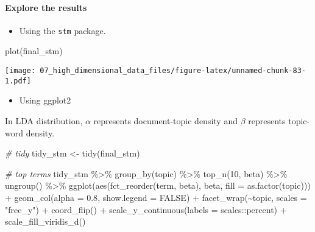 \documentclass[
]{book}
\newenvironment{Shaded}{\begin{snugshade}}{\end{snugshade}}
\newcommand{\AttributeTok}[1]{\textcolor[rgb]{0.77,0.63,0.00}{#1}}
\newcommand{\CommentTok}[1]{\textcolor[rgb]{0.56,0.35,0.01}{\textit{#1}}}
\newcommand{\ConstantTok}[1]{\textcolor[rgb]{0.00,0.00,0.00}{#1}}
\newcommand{\DecValTok}[1]{\textcolor[rgb]{0.00,0.00,0.81}{#1}}
\newcommand{\FloatTok}[1]{\textcolor[rgb]{0.00,0.00,0.81}{#1}}
\newcommand{\FunctionTok}[1]{\textcolor[rgb]{0.00,0.00,0.00}{#1}}
\newcommand{\NormalTok}[1]{#1}
\newcommand{\OtherTok}[1]{\textcolor[rgb]{0.56,0.35,0.01}{#1}}
\newcommand{\SpecialCharTok}[1]{\textcolor[rgb]{0.00,0.00,0.00}{#1}}
\newcommand{\StringTok}[1]{\textcolor[rgb]{0.31,0.60,0.02}{#1}}
\providecommand{\tightlist}{%
  \setlength{\itemsep}{0pt}\setlength{\parskip}{0pt}}
\begin{document}
\hypertarget{explore-the-results}{%
\paragraph{Explore the results}\label{explore-the-results}}

\begin{itemize}
\tightlist
\item
  Using the \texttt{stm} package.
\end{itemize}

\begin{Shaded}
\begin{Highlighting}[]
\FunctionTok{plot}\NormalTok{(final\_stm)}
\end{Highlighting}
\end{Shaded}

\texttt{[image: 07\_high\_dimensional\_data\_files/figure-latex/unnamed-chunk-83-1.pdf]}

\begin{itemize}
\tightlist
\item
  Using ggplot2
\end{itemize}

In LDA distribution, \(\alpha\) represents document-topic density and \(\beta\) represents topic-word density.

\begin{Shaded}
\begin{Highlighting}[]
\CommentTok{\# tidy}
\NormalTok{tidy\_stm }\OtherTok{\textless{}{-}} \FunctionTok{tidy}\NormalTok{(final\_stm)}

\CommentTok{\# top terms}
\NormalTok{tidy\_stm }\SpecialCharTok{\%\textgreater{}\%}
  \FunctionTok{group\_by}\NormalTok{(topic) }\SpecialCharTok{\%\textgreater{}\%}
  \FunctionTok{top\_n}\NormalTok{(}\DecValTok{10}\NormalTok{, beta) }\SpecialCharTok{\%\textgreater{}\%}
  \FunctionTok{ungroup}\NormalTok{() }\SpecialCharTok{\%\textgreater{}\%}
  \FunctionTok{ggplot}\NormalTok{(}\FunctionTok{aes}\NormalTok{(}\FunctionTok{fct\_reorder}\NormalTok{(term, beta), beta, }\AttributeTok{fill =} \FunctionTok{as.factor}\NormalTok{(topic))) }\SpecialCharTok{+}
  \FunctionTok{geom\_col}\NormalTok{(}\AttributeTok{alpha =} \FloatTok{0.8}\NormalTok{, }\AttributeTok{show.legend =} \ConstantTok{FALSE}\NormalTok{) }\SpecialCharTok{+}
  \FunctionTok{facet\_wrap}\NormalTok{(}\SpecialCharTok{\textasciitilde{}}\NormalTok{topic, }\AttributeTok{scales =} \StringTok{"free\_y"}\NormalTok{) }\SpecialCharTok{+}
  \FunctionTok{coord\_flip}\NormalTok{() }\SpecialCharTok{+}
  \FunctionTok{scale\_y\_continuous}\NormalTok{(}\AttributeTok{labels =}\NormalTok{ scales}\SpecialCharTok{::}\NormalTok{percent) }\SpecialCharTok{+}
  \FunctionTok{scale\_fill\_viridis\_d}\NormalTok{()}
\end{Highlighting}
\end{Shaded}
\end{document}
